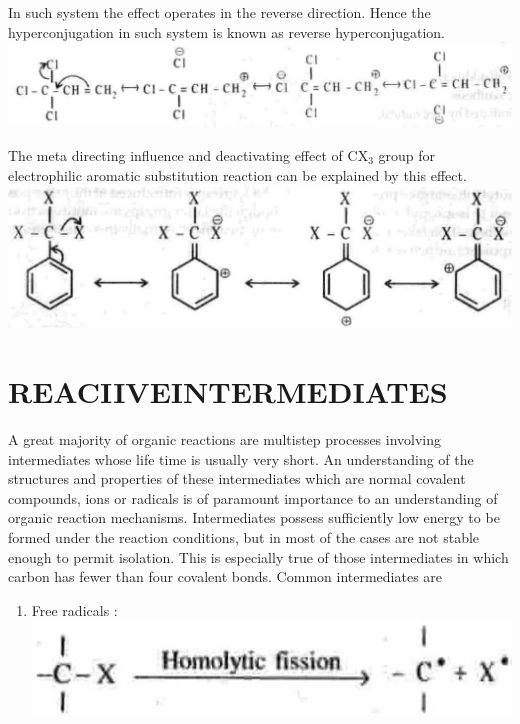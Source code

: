 \documentclass[10pt]{article}
\begin{document}
In such system the effect operates in the reverse direction. Hence the hyperconjugation in such system is known as reverse hyperconjugation.\\
\includegraphics[max width=\textwidth, center]{2025_01_28_8470952b98110cec3aabg-083(1)}

The meta directing influence and deactivating effect of $\mathrm{CX}_{3}$ group for electrophilic aromatic substitution reaction can be explained by this effect.\\
\includegraphics[max width=\textwidth, center]{2025_01_28_8470952b98110cec3aabg-084(1)}

\section*{REACIIVEINTERMEDIATES}
A great majority of organic reactions are multistep processes involving intermediates whose life time is usually very short. An understanding of the structures and properties of these intermediates which are normal covalent compounds, ions or radicals is of paramount importance to an understanding of organic reaction mechanisms. Intermediates possess sufficiently low energy to be formed under the reaction conditions, but in most of the cases are not stable enough to permit isolation. This is especially true of those intermediates in which carbon has fewer than four covalent bonds. Common intermediates are

\begin{enumerate}
  \item Free radicals :\\
\includegraphics[max width=\textwidth, center]{2025_01_28_8470952b98110cec3aabg-084(2)}
\end{enumerate}
\end{document}
